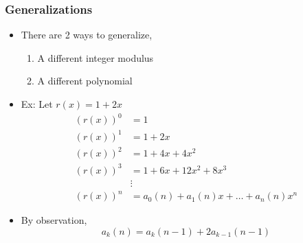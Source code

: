 \documentclass{beamer}
\begin{document}

\begin{frame}
    \frametitle{Generalizations}
    \begin{itemize}
        \item There are 2 ways to generalize,
        \begin{enumerate}
            \item A different integer modulus 
            \item A different polynomial
        \end{enumerate}
        \item Ex: Let $r(x) = 1+2x$
        \begin{align*}
            (r(x))^0 &= 1 \\
            (r(x))^1 &= 1+2x \\
            (r(x))^2 &= 1 + 4x + 4x^2\\
            (r(x))^3 &= 1 + 6x + 12x^2 + 8x^3 \\
            &\vdots \\
            (r(x))^n &= a_0(n) + a_1(n)x + \dots + a_n(n)x^n
        \end{align*}
        \item By observation,
        \begin{equation*}
            a_k(n) = a_{k}(n-1) + 2a_{k-1}(n-1)
        \end{equation*}
    \end{itemize}
\end{frame}
\end{document}
